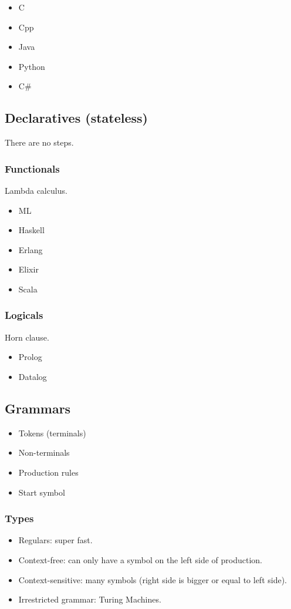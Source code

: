 \documentclass[11pt]{article}
\begin{document}
\begin{itemize}
\item C
\item Cpp
\item Java
\item Python
\item C\#
\end{itemize}
\subsection{Declaratives (stateless)}
\label{sec:org4e8b366}
There are no steps.
\subsubsection{Functionals}
\label{sec:orgcde1969}
Lambda calculus.
\begin{itemize}
\item ML
\item Haskell
\item Erlang
\item Elixir
\item Scala
\end{itemize}
\subsubsection{Logicals}
\label{sec:orge13fa15}
Horn clause.
\begin{itemize}
\item Prolog
\item Datalog
\end{itemize}
\subsection{Grammars}
\label{sec:orgf56d3ca}
\begin{itemize}
\item Tokens (terminals)
\item Non-terminals
\item Production rules
\item Start symbol
\end{itemize}
\subsubsection{Types}
\label{sec:org8db120c}
\begin{itemize}
\item Regulars: super fast.
\item Context-free: can only have a symbol on the left side of production.
\item Context-sensitive: many symbols (right side is bigger or equal to left side).
\item Irrestricted grammar: Turing Machines.
\end{itemize}
\end{document}
